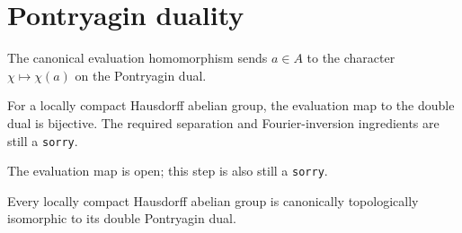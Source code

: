 \section{Pontryagin duality}

\begin{definition}
\label{def:pd-eval}
\leanok
The canonical evaluation homomorphism sends $a\in A$ to the character $\chi\mapsto\chi(a)$ on the Pontryagin dual.
\end{definition}

\begin{theorem}
\label{thm:pd-bijective}
\notready
{}
For a locally compact Hausdorff abelian group, the evaluation map to the double dual is bijective. The required separation and Fourier-inversion ingredients are still a \texttt{sorry}.
\end{theorem}

\begin{theorem}
\label{thm:pd-open}
\notready
{}
The evaluation map is open; this step is also still a \texttt{sorry}.
\end{theorem}

\begin{theorem}
\label{thm:pontryagin-duality}
\notready
{}
Every locally compact Hausdorff abelian group is canonically topologically isomorphic to its double Pontryagin dual.
\end{theorem}
